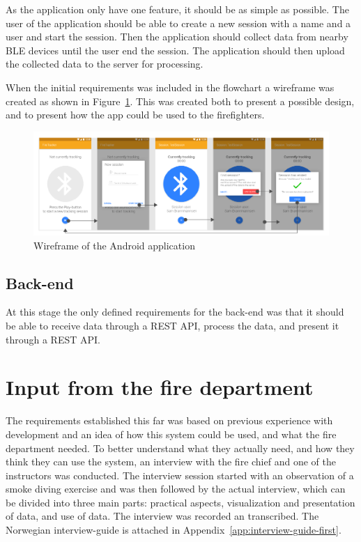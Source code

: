 \documentclass[../Main/thesis.tex]{subfiles}
\begin{document}
As the application only have one feature, it should be as simple as possible. 
The user of the application should be able to create a new session with a name and a user and start the session. 
Then the application should collect data from nearby BLE devices until the user end the session.
The application should then upload the collected data to the server for processing.

When the initial requirements was included in the flowchart a wireframe was created as shown in Figure~\ref{fig:wireframe-app-1}.
This was created both to present a possible design, and to present how the app could be used to the firefighters. 

\begin{figure}
	\centering
	\includegraphics[width=\linewidth]{../fig/wireframe_app_1}
	\caption{Wireframe of the Android application}
	\label{fig:wireframe-app-1}
\end{figure}

\subsection{Back-end}
At this stage the only defined requirements for the back-end was that it should be able to receive data through a REST API, process the data, and present it through a REST API.

\section{Input from the fire department}
The requirements established this far was based on previous experience with development and an idea of how this system could be used, and what the fire department needed.
To better understand what they actually need, and how they think they can use the system, an interview with the fire chief and one of the instructors was conducted.
The interview session started with an observation of a smoke diving exercise and was then followed by the actual interview, which can be divided into three main parts: practical aspects, visualization and presentation of data, and use of data.
The interview was recorded an transcribed.
The Norwegian interview-guide is attached in Appendix~\ref{app:interview-guide-first}.
\end{document}
